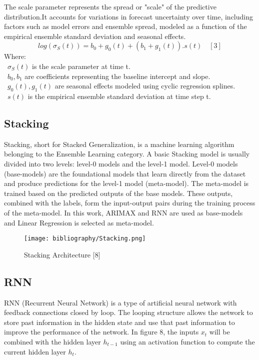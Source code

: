 \documentclass{ieeeojies}
\begin{document}
The scale parameter represents the spread or "scale" of the predictive distribution.It accounts for variations in forecast uncertainty over time, including factors such as model errors and ensemble spread, modeled as a function of the empirical ensemble standard deviation and seasonal effects.
\[log(\sigma_S(t)) = b_0 + g_0(t) + (b_1 + g_1(t)).s(t) \quad[3]\]
Where: \\
        \indent\textbullet\ \(\sigma_S(t)\) is the scale parameter at time t. \\
        \indent\textbullet\ \(b_0, b_1\) are coefficients representing the baseline intercept and slope. \\
        \indent\textbullet\ \(g_0(t), g_1(t)\) are seasonal effects modeled using cyclic regression splines. \\
        \indent\textbullet\ \(s(t)\) is the empirical ensemble standard deviation at time step t.

\subsection{Stacking}

Stacking, short for Stacked Generalization, is a machine learning algorithm belonging to the Ensemble Learning category. A basic Stacking model is usually divided into two levels: level-0 models and the level-1 model. Level-0 models (base-models) are the foundational models that learn directly from the dataset and produce predictions for the level-1 model (meta-model). The meta-model is trained based on the predicted outputs of the base models. These outputs, combined with the labels, form the input-output pairs during the training process of the meta-model. In this work, ARIMAX and RNN are used as base-models and Linear Regression is selected as meta-model.  
\begin{figure}[H]
  \centering
  \begin{minipage}{0.9\linewidth}
    \centering
    \texttt{[image: bibliography/Stacking.png]}
    \caption{Stacking Architecture [8]}
    \label{fig8}
  \end{minipage}
\end{figure}

\subsection{RNN}
RNN (Recurrent Neural Network) is a type of artificial neural network with feedback connections closed by loop. The looping structure allows the network to store past information in the hidden state and use that past information to improve the performance of the network. In figure 8, the inputs \( x_t \) will be combined with the hidden layer \( h_{t-1} \) using an activation function to compute the current hidden layer \( h_t \).
\end{document}
